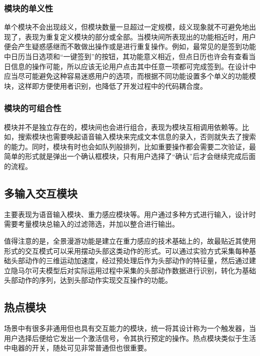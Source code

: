 \subsubsection{模块的单义性}
单个模块不会出现歧义，但模块数量一旦超过一定规模，歧义现象就不可避免地出现了，表现为重复定义模块的部分或全部。当模块间所表现出的功能相近时，用户便会产生疑惑感继而不敢做出操作或是进行重复操作。例如，最常见的是签到功能中日历当日选项和“一键签到”的按钮，其功能意义相近，但点日历也许会有查看当日信息的操作可能，所以应该无论用户点击其中任意一项都可完成签到。在设计中应当尽可能避免这种容易迷惑用户的选项，而根据不同功能设置多个单义的功能模块，这样即方便使用者识别，也降低了开发过程中的代码耦合度。

\subsubsection{模块的可组合性}
模块并不是独立存在的，模块间也会进行组合，表现为模块互相调用依赖等。比如，搜索模块也需要唤起语音输入模块来完成文本信息的录入，否则就失去了搜索的能力。同时，模块有时也会如队列般排列，比如重要操作都会需要二次验证，最简单的形式就是弹出一个确认框模块，只有用户选择了“确认”后才会继续完成后面的流程。


\subsection{多输入交互模块}
主要表现为语音输入模块、重力感应模块等。用户通过多种方式进行输入，设计时需要考量模块总输入的过滤筛选，并加以整合进行输出。

值得注意的是，全景漫游功能是建立在重力感应的技术基础上的，故最贴近其使用形式的交互模式可以采用摆动头部这类动作的形式。可以通过实验方式采集每种基础头部动作的三维运动加速度，经过预处理后作为头部动作的特征量，然后通过建立隐马尔可夫模型后对实际运用过程中采集的头部动作数据进行识别，转化为基础头部动作的序列，达到头部动作实现交互操作的功能。

\subsection{热点模块}
场景中有很多非通用但也具有交互能力的模块，统一将其设计称为一个触发器，当用户选择后便给它发出一个激活信号，令其执行预定的操作。热点模块类似于生活中电器的开关，随处可见非常普通但也很重要。
